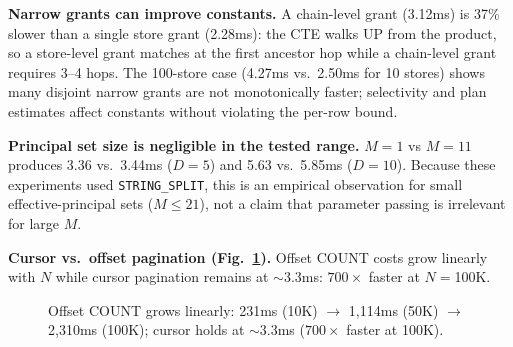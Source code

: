 \documentclass[conference]{IEEEtran}
\begin{document}
\textbf{Narrow grants can improve constants.} A chain-level grant (3.12ms) is 37\% slower than a single store grant (2.28ms): the CTE walks UP from the product, so a store-level grant matches at the first ancestor hop while a chain-level grant requires 3--4 hops. The 100-store case (4.27ms vs.\ 2.50ms for 10 stores) shows many disjoint narrow grants are not monotonically faster; selectivity and plan estimates affect constants without violating the per-row bound.

\textbf{Principal set size is negligible in the tested range.} $M{=}1$ vs $M{=}11$ produces 3.36 vs.\ 3.44ms ($D{=}5$) and 5.63 vs.\ 5.85ms ($D{=}10$). Because these experiments used \texttt{STRING\_SPLIT}, this is an empirical observation for small effective-principal sets ($M \leq 21$), not a claim that parameter passing is irrelevant for large $M$.

\textbf{Cursor vs.\ offset pagination (Fig.~\ref{fig:pagination}).} Offset COUNT costs grow linearly with $N$ while cursor pagination remains at ${\sim}$3.3ms: $700\times$ faster at $N{=}$100K.

\begin{figure}[t]
\centering
{}
\caption{Offset COUNT grows linearly: 231ms (10K) $\to$ 1{,}114ms (50K) $\to$ 2{,}310ms (100K); cursor holds at ${\sim}$3.3ms ($700\times$ faster at 100K).}
\label{fig:pagination}
\end{figure}
\end{document}
